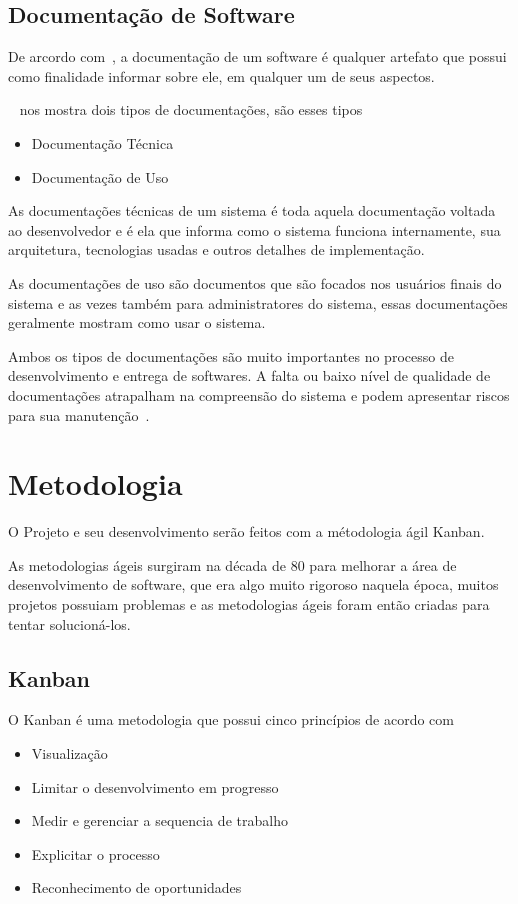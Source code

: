 \documentclass[12pt]{article}
\begin{document}
\subsection{Documentação de Software}

De arcordo com~\cite{Forward02softwaredocumentation}, a documentação de um software é qualquer
artefato que possui como finalidade informar sobre ele, em qualquer um de seus aspectos.

~\cite{Coelho_2009} nos mostra dois tipos de documentações, são esses tipos

\begin{itemize}
	\item Documentação Técnica
	\item Documentação de Uso
\end{itemize}

As documentações técnicas de um sistema é toda aquela documentação voltada ao desenvolvedor e é
ela que informa como o sistema funciona internamente, sua arquitetura, tecnologias usadas e outros detalhes de implementação.

As documentações de uso são documentos que são focados nos usuários finais do sistema e as vezes também para administratores do sistema,
essas documentações geralmente mostram como usar o sistema.

Ambos os tipos de documentações são muito importantes no processo de desenvolvimento e entrega de softwares. A falta ou
baixo nível de qualidade de documentações atrapalham na compreensão do sistema e podem apresentar
riscos para sua manutenção~\cite{deinvestigaccao}.

\section{Metodologia}

O Projeto e seu desenvolvimento serão feitos com a métodologia ágil Kanban.

As metodologias ágeis surgiram na década de 80 para melhorar a área de desenvolvimento de software,
que era algo muito rigoroso naquela época, muitos projetos possuiam problemas e as metodologias ágeis foram então
criadas para tentar solucioná-los.~\cite{Santos05}

\subsection{Kanban}

O Kanban é uma metodologia que possui cinco princípios de acordo com~\cite{Agile06}
\begin{itemize}
  \item Visualização
  \item Limitar o desenvolvimento em progresso
  \item Medir e gerenciar a sequencia de trabalho
  \item Explicitar o processo
  \item Reconhecimento de oportunidades
\end{itemize}
\end{document}
